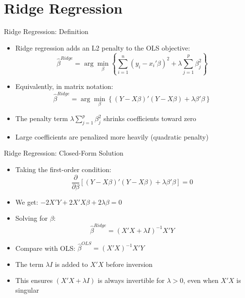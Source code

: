 \documentclass[aspectratio=169]{beamer}
\begin{document}
\section{Ridge Regression}

\begin{frame}{Ridge Regression: Definition}
\begin{itemize}
    \item Ridge regression adds an L2 penalty to the OLS objective:
    \[\hat{\beta}^{Ridge} = \arg\min_{\beta} \left\{ \sum_{i=1}^{n}(y_i - x_i'\beta)^2 + \lambda \sum_{j=1}^{p}\beta_j^2 \right\}\]
    \item Equivalently, in matrix notation:
    \[\hat{\beta}^{Ridge} = \arg\min_{\beta} \left\{ (Y - X\beta)'(Y - X\beta) + \lambda \beta'\beta \right\}\]
    \item The penalty term $\lambda \sum_{j=1}^{p}\beta_j^2$ shrinks coefficients toward zero
    \item Large coefficients are penalized more heavily (quadratic penalty)
\end{itemize}
\end{frame}

\begin{frame}{Ridge Regression: Closed-Form Solution}
\begin{itemize}
    \item Taking the first-order condition:
    \[\frac{\partial}{\partial \beta}\left[(Y - X\beta)'(Y - X\beta) + \lambda \beta'\beta\right] = 0\]
    \item We get: $-2X'Y + 2X'X\beta + 2\lambda\beta = 0$
    \item Solving for $\beta$:
    \[\hat{\beta}^{Ridge} = (X'X + \lambda I)^{-1}X'Y\]
    \item Compare with OLS: $\hat{\beta}^{OLS} = (X'X)^{-1}X'Y$
    \item The term $\lambda I$ is added to $X'X$ before inversion
    \item This ensures $(X'X + \lambda I)$ is always invertible for $\lambda > 0$, even when $X'X$ is singular
\end{itemize}
\end{frame}
\end{document}
